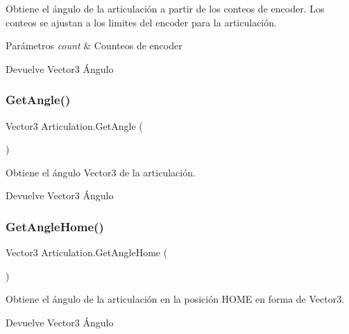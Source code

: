 Obtiene el ángulo de la articulación a partir de los conteos de encoder. Los conteos se ajustan a los limites del encoder para la articulación. 
\begin{DoxyParams}{Parámetros}
{\em count} & Counteos de encoder \\
\hline
\end{DoxyParams}
\begin{DoxyReturn}{Devuelve}
Vector3 Ángulo 
\end{DoxyReturn}
\mbox{\label{class_articulation_af80ebaf44266ca6e4042b23d3a3392c9}} 
\subsubsection{\texorpdfstring{GetAngle()}{GetAngle()}}
{\footnotesize\ttfamily Vector3 Articulation.\+Get\+Angle (\begin{DoxyParamCaption}{ }\end{DoxyParamCaption})\hspace{0.3cm}{\ttfamily [inline]}}

Obtiene el ángulo Vector3 de la articulación. \begin{DoxyReturn}{Devuelve}
Vector3 Ángulo 
\end{DoxyReturn}
\mbox{\label{class_articulation_ac933fade16023f1adb224eed98427cb9}} 
\subsubsection{\texorpdfstring{GetAngleHome()}{GetAngleHome()}}
{\footnotesize\ttfamily Vector3 Articulation.\+Get\+Angle\+Home (\begin{DoxyParamCaption}{ }\end{DoxyParamCaption})\hspace{0.3cm}{\ttfamily [inline]}}

Obtiene el ángulo de la articulación en la posición H\+O\+ME en forma de Vector3. \begin{DoxyReturn}{Devuelve}
Vector3 Ángulo 
\end{DoxyReturn}
\mbox{\label{class_articulation_ac60e77664f8666756cde14a3947a8306}} 
